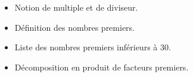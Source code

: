 \begin{prerequis}[Prérequis]    
    \begin{itemize}
        \item Notion de multiple et de diviseur.
        \item Définition des nombres premiers.
        \item Liste des nombres premiers inférieurs à $30$.
        \item Décomposition en produit de facteurs premiers.
    \end{itemize}
\end{prerequis}
